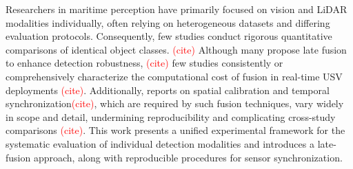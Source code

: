 Researchers in maritime perception have primarily focused on vision and \ac{LiDAR} modalities individually, often relying on heterogeneous datasets and differing evaluation protocols. 
Consequently, few studies conduct rigorous quantitative comparisons of identical object classes. \textcolor{red}{(cite)}
Although many propose late fusion to enhance detection robustness, \textcolor{red}{(cite)} few studies consistently or comprehensively characterize the computational cost of fusion in real-time \ac{USV} deployments \textcolor{red}{(cite)}.
Additionally, reports on spatial calibration and temporal synchronization\textcolor{red}{(cite)}, which are required by such fusion techniques, vary widely in scope and detail, undermining reproducibility and complicating cross-study comparisons \textcolor{red}{(cite)}.
This work presents a unified experimental framework for the systematic evaluation of individual detection modalities and introduces a late-fusion approach, along with reproducible procedures for sensor synchronization.

